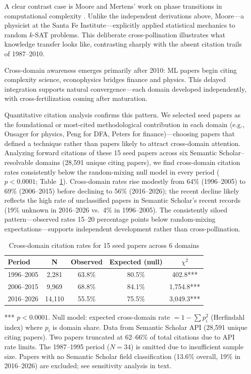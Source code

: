 \documentclass[11pt]{article}
\begin{document}
A clear contrast case is Moore and Mertens' work on phase transitions in computational complexity \citep{moore2011}. Unlike the independent derivations above, Moore---a physicist at the Santa Fe Institute---explicitly applied statistical mechanics to random $k$-SAT problems. This deliberate cross-pollination illustrates what knowledge transfer looks like, contrasting sharply with the absent citation trails of 1987--2010.

Cross-domain awareness emerges primarily after 2010: ML papers begin citing complexity science, econophysics bridges finance and physics. This delayed integration supports natural convergence---each domain developed independently, with cross-fertilization coming after maturation.

Quantitative citation analysis confirms this pattern. We selected seed papers as the foundational or most-cited methodological contribution in each domain (e.g., Onsager for physics, Peng for DFA, Peters for finance)---choosing papers that defined a technique rather than papers likely to attract cross-domain attention. Analyzing forward citations of these 15 seed papers across six Semantic Scholar--resolvable domains (28{,}591 unique citing papers), we find cross-domain citation rates consistently below the random-mixing null model in every period ($p < 0.0001$; Table~\ref{tab:citations}). Cross-domain rates rise modestly from 64\% (1996--2005) to 69\% (2006--2015) before declining to 56\% (2016--2026); the recent decline likely reflects the high rate of unclassified papers in Semantic Scholar's recent records (19\% unknown in 2016--2026 vs.\ 4\% in 1996--2005). The consistently siloed pattern---observed rates 15--20 percentage points below random-mixing expectations---supports independent development rather than cross-pollination.

\begin{table}[ht]
\centering
\caption{Cross-domain citation rates for 15 seed papers across 6 domains}
\label{tab:citations}
\begin{tabular}{lcccc}
\toprule
\textbf{Period} & \textbf{N} & \textbf{Observed} & \textbf{Expected (null)} & \textbf{$\chi^2$} \\
\midrule
1996--2005 & 2{,}281 & 63.8\% & 80.5\% & 402.8*** \\
2006--2015 & 9{,}969 & 68.8\% & 84.1\% & 1{,}754.8*** \\
2016--2026 & 14{,}110 & 55.5\% & 75.5\% & 3{,}049.3*** \\
\bottomrule
\end{tabular}

\smallskip
\noindent\footnotesize{*** $p < 0.0001$. Null model: expected cross-domain rate $= 1 - \sum p_i^2$ (Herfindahl index) where $p_i$ is domain share. Data from Semantic Scholar API (28{,}591 unique citing papers). Two papers truncated at 62--66\% of total citations due to API rate limits. The 1987--1995 period ($N = 34$) is omitted due to insufficient sample size. Papers with no Semantic Scholar field classification (13.6\% overall, 19\% in 2016--2026) are excluded; see sensitivity analysis in text.}
\end{table}
\end{document}
